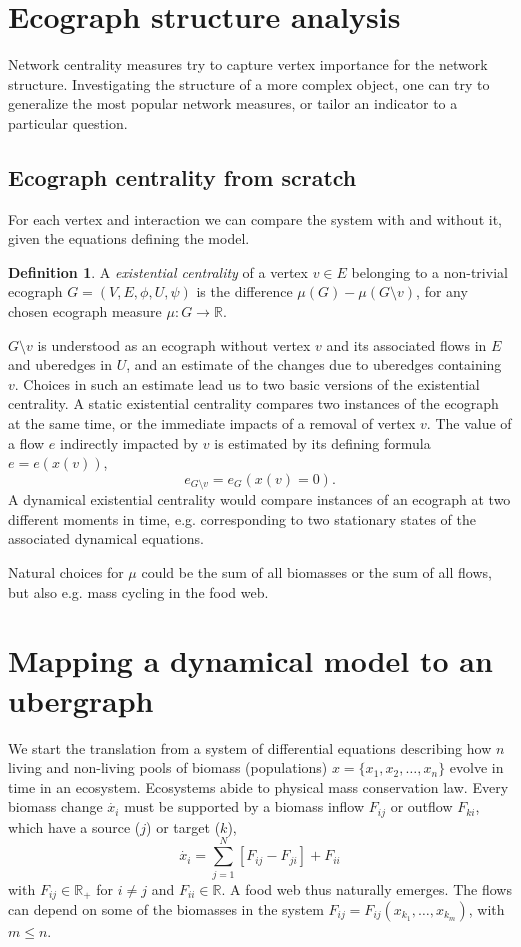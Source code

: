 \documentclass[a4paper,12pt]{article}
\theoremstyle{definition}
\newtheorem{definition}{Definition}%
\theoremstyle{remark}
\begin{document}
\section{Ecograph structure analysis}
Network centrality measures try to capture vertex importance for the network structure. Investigating the structure of a more complex object, one can try to generalize the most popular network measures, or tailor an indicator to a particular question.


\subsection{Ecograph centrality from scratch}
For each vertex and interaction we can compare the system with and without it, given the equations defining the model.
\begin{definition}
    A \emph{existential centrality} of a vertex $v \in E$ belonging to a non-trivial ecograph $G=(V,E, \phi, U, \psi)$ is the difference $\mu(G)-\mu(G\setminus v)$, for any chosen ecograph measure $\mu: G \rightarrow \mathbb{R}$.
\end{definition}
$G\setminus v$ is understood as an ecograph without vertex $v$ and its associated flows in $E$ and uberedges in $U$, and an estimate of the changes due to uberedges containing $v$. Choices in such an estimate lead us to two basic versions of the existential centrality. A static existential centrality compares two instances of the ecograph at the same time, or the immediate impacts of a removal of vertex $v$. The value of a flow $e$ indirectly impacted by $v$ is estimated by its defining formula $e=e(x(v))$,
\begin{equation}
e_{G\setminus v}=e_{G}(x(v)=0).
\end{equation}
A dynamical existential centrality would compare instances of an ecograph at two different moments in time, e.g. corresponding to two stationary states of the associated dynamical equations.

Natural choices for $\mu$ could be the sum of all biomasses or the sum of all flows, but also e.g. mass cycling in the food web.   



\section{Mapping a dynamical model to an ubergraph}

We start the translation from a system of differential equations describing how $n$ living and non-living pools of biomass (populations) $x=\{x_1, x_2, \ldots, x_n\}$ evolve in time in an ecosystem. Ecosystems abide to physical mass conservation law. Every biomass change $\dot{x_i}$ must be supported by a biomass inflow $F_{ij}$ or outflow $F_{ki}$, which have a source ($j$) or target ($k$),
\begin{equation}
    \dot{x_i}=\sum_{j=1}^{N}[F_{ij}-F_{ji}]+F_{ii}
\end{equation}
with $F_{ij}\in \mathbb{R_+}$ for $i \neq j$ and $F_{ii} \in \mathbb{R}$.
A food web thus naturally emerges. The flows can depend on some of the biomasses in the system $F_{ij}=F_{ij}(x_{k_1}, \ldots, x_{k_m})$, with $m\leq n$.
\end{document}
